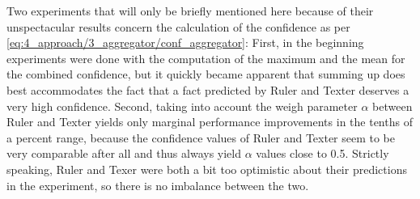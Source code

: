 Two experiments that will only be briefly mentioned here because of their unspectacular results concern the calculation of the confidence as per \autoref{eq:4_approach/3_aggregator/conf_aggregator}: First, in the beginning experiments were done with the computation of the maximum and the mean for the combined confidence, but it quickly became apparent that summing up does best accommodates the fact that a fact predicted by Ruler and Texter deserves a very high confidence. Second, taking into account the weigh parameter $\alpha$ between Ruler and Texter yields only marginal performance improvements in the tenths of a percent range, because the confidence values of Ruler and Texter seem to be very comparable after all and thus always yield $\alpha$ values close to 0.5. Strictly speaking, Ruler and Texer were both a bit too optimistic about their predictions in the experiment, so there is no imbalance between the two.
